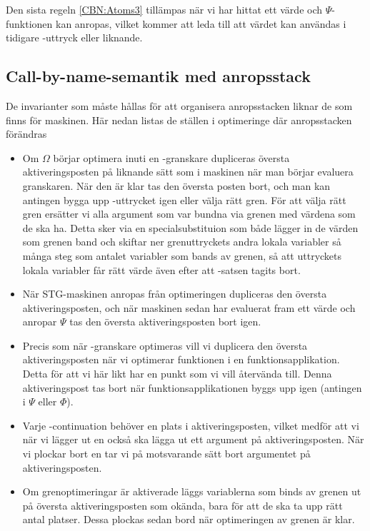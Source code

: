 \documentclass[../Optimise]{subfiles}
\begin{document}
Den sista regeln \eqref{CBN:Atoms3} tillämpas när vi har hittat ett värde och $\Psi$-funktionen kan anropas,
vilket kommer att leda till att värdet kan användas i tidigare -uttryck eller liknande.


\subsection{Call-by-name-semantik med anropsstack}


De invarianter som måste hållas för att organisera anropsstacken liknar de som finns
för maskinen. Här nedan listas de ställen i optimeringe där anropsstacken förändras



\begin{itemize}
\item
Om $\Omega$ börjar optimera inuti en -granskare dupliceras översta aktiveringsposten 
på liknande sätt som i maskinen när man börjar evaluera granskaren. När den är klar
tas den översta posten bort, och man kan antingen bygga upp -uttrycket igen
eller välja rätt gren. För att välja rätt gren ersätter vi alla argument som var
bundna via grenen med värdena som de ska ha. Detta sker via en specialsubstituion 
som både lägger in de värden som grenen band och skiftar ner grenuttryckets andra lokala 
variabler så många steg som antalet variabler som bands av grenen, så att uttryckets
lokala variabler får rätt värde även efter att -satsen tagits bort.

\item
När STG-maskinen anropas från optimeringen dupliceras den översta aktiveringsposten,
och när maskinen sedan har evaluerat fram ett värde och anropar $\Psi$ tas den översta aktiveringsposten bort igen.

\item
Precis som när -granskare optimeras vill vi duplicera den översta aktiveringsposten när vi 
optimerar funktionen i en funktionsapplikation. Detta för att vi här likt 
har en punkt som vi vill återvända till. Denna aktiveringspost tas bort när 
funktionsapplikationen byggs upp igen (antingen i $\Psi$ eller $\Phi$). 

\item
Varje -continuation behöver en plats i aktiveringsposten, vilket medför
att vi när vi lägger ut en  också ska lägga ut ett argument på aktiveringsposten.
När vi plockar bort en  tar vi på motsvarande sätt bort argumentet på aktiveringsposten.

\item
Om grenoptimeringar är aktiverade läggs variablerna som binds av grenen ut på
översta aktiveringsposten som okända, bara för att de ska ta upp rätt antal platser.
Dessa plockas sedan bord när optimeringen av grenen är klar. 


\end{itemize}
\end{document}
